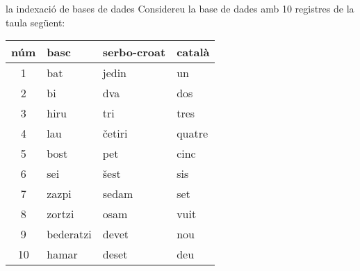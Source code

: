 \begin{persabermes}{la indexació de bases de dades}
  Considereu la base de dades amb 10 registres de la taula següent:
 \begin{center}
 \begin{tabular}{clll}
 \hline
 {\sc núm} & {\sc basc} & {\sc serbo-croat} & {\sc català} \\
 \hline 
 \hline
  1 & bat  &     jedin &       un \\
  2 & bi   &     dva   &       dos \\
  3 & hiru &     tri   &       tres \\
  4 & lau  &     \v{c}etiri &      quatre \\
  5 & bost &     pet    &      cinc \\
  6 & sei  &     \v{s}est   &      sis \\
  7 & zazpi &    sedam  &      set \\
  8 & zortzi &   osam   &      vuit \\
  9 & bederatzi & devet &       nou \\
 10 & hamar &    deset  &      deu \\
 \hline
 \end{tabular}
 \end{center}


\end{persabermes}
